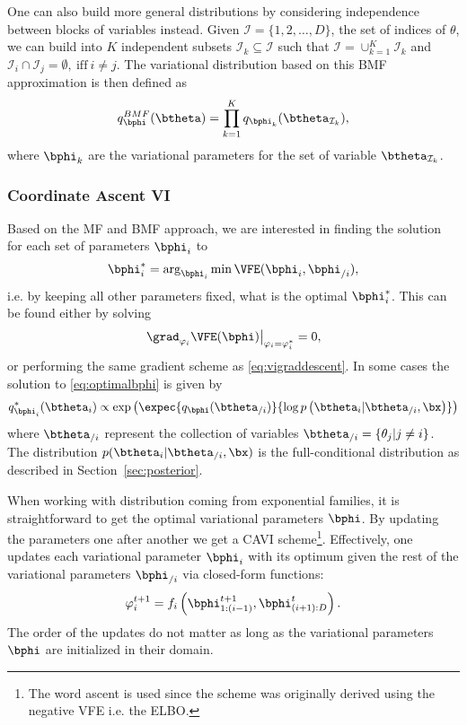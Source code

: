 One can also build more general distributions by considering independence between blocks of variables instead.
Given $\mathcal{I}=\{1,2,\ldots,D\}$, the set of indices of $\theta$, we can build into $K$ independent subsets $\mathcal{I}_k \subseteq \mathcal{I}$ such that  $\mathcal{I} = \cup_{k=1}^K \mathcal{I}_{k}$ and $\mathcal{I}_i \cap \mathcal{I}_j=\emptyset,~\mathrm{iff}~i \neq j$.
The variational distribution based on this \ac{BMF} approximation is then defined as
\begin{align}
    q^{BMF}_{\bphi}(\btheta) = \prod_{k=1}^K q_{\bphi_k}(\btheta_{\mathcal{I}_k}),
\end{align}
where $\bphi_k$ are the variational parameters for the set of variable $\btheta_{\mathcal{I}_k}$.

\subsubsection{Coordinate Ascent VI}
\label{sec:cavi}
Based on the \ac{MF} and \ac{BMF} approach, we are interested in finding the solution for each set of parameters $\bphi_i$ to
\begin{align}
    \bphi_i^* = \arg_{\bphi_i}\min \VFE(\bphi_i, \bphi_{/i}),
    \label{eq:optimalbphi}
\end{align}
i.e. by keeping all other parameters fixed, what is the optimal $\bphi_i^*$.
This can be found either by solving
\begin{align}
\left.\grad_{\varphi_i}\VFE(\bphi)\right\vert_{\varphi_i=\varphi_i^*} = 0,
\end{align}
or performing the same gradient scheme as \eqref{eq:vigraddescent}.
In some cases the solution to \eqref{eq:optimalbphi} is given by
\begin{align}
q_{\bphi_i}^*(\btheta_i) \propto \exp\left(\expec{q_{\bphi}(\btheta_{/i})}{\log p\left(\btheta_i|\btheta_{/i},\bx\right)}\right)
\end{align}
where $\btheta_{/i}$ represent the collection of variables $\btheta_{/i} = \{\theta_j | j \neq i\}$.
The distribution $p(\btheta_i|\btheta_{/i},\bx)$ is the full-conditional distribution as described in Section~\ref{sec:posterior}.

When working with distribution coming from exponential families, it is straightforward to get the optimal variational parameters $\bphi$.
By updating the parameters one after another we get a \ac{CAVI} scheme\footnote{The word ascent is used since the scheme was originally derived using the negative \ac{VFE} i.e. the \ac{ELBO}.}.
Effectively, one updates each variational parameter $\bphi_i$ with its optimum given the rest of the variational parameters $\bphi_{/i}$ via closed-form functions:
\begin{align}
\varphi_i^{t+1} = f_i\left(\bphi_{1:(i-1)}^{t+1}, \bphi_{(i+1):D}^t\right).
\end{align}
The order of the updates do not matter as long as the variational parameters $\bphi$ are initialized in their domain.

